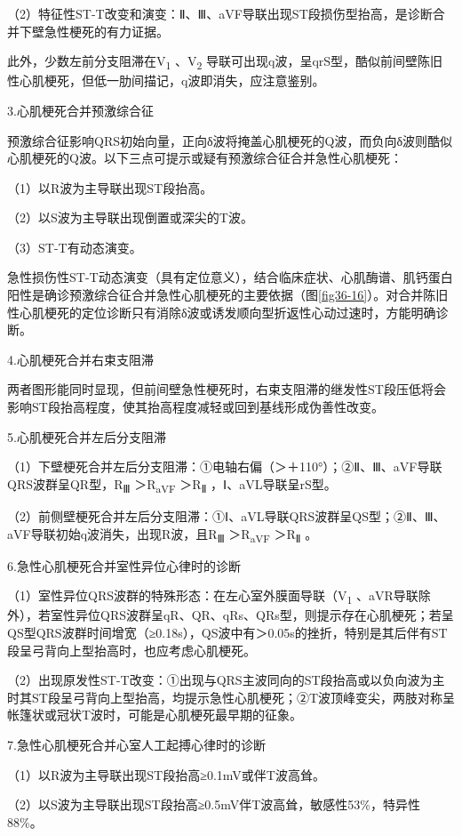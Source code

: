 （2）特征性ST-T改变和演变：Ⅱ、Ⅲ、aVF导联出现ST段损伤型抬高，是诊断合并下壁急性梗死的有力证据。

此外，少数左前分支阻滞在V\textsubscript{1} 、V\textsubscript{2}
导联可出现q波，呈qrS型，酷似前间壁陈旧性心肌梗死，但低一肋间描记，q波即消失，应注意鉴别。

3.心肌梗死合并预激综合征

预激综合征影响QRS初始向量，正向δ波将掩盖心肌梗死的Q波，而负向δ波则酷似心肌梗死的Q波。以下三点可提示或疑有预激综合征合并急性心肌梗死：

（1）以R波为主导联出现ST段抬高。

（2）以S波为主导联出现倒置或深尖的T波。

（3）ST-T有动态演变。

急性损伤性ST-T动态演变（具有定位意义），结合临床症状、心肌酶谱、肌钙蛋白阳性是确诊预激综合征合并急性心肌梗死的主要依据（图\ref{fig36-16}）。对合并陈旧性心肌梗死的定位诊断只有消除δ波或诱发顺向型折返性心动过速时，方能明确诊断。

4.心肌梗死合并右束支阻滞

两者图形能同时显现，但前间壁急性梗死时，右束支阻滞的继发性ST段压低将会影响ST段抬高程度，使其抬高程度减轻或回到基线形成伪善性改变。

5.心肌梗死合并左后分支阻滞

（1）下壁梗死合并左后分支阻滞：①电轴右偏（＞＋110°）；②Ⅱ、Ⅲ、aVF导联QRS波群呈QR型，R\textsubscript{Ⅲ}
＞R\textsubscript{aVF} ＞R\textsubscript{Ⅱ} ，Ⅰ、aVL导联呈rS型。

（2）前侧壁梗死合并左后分支阻滞：①Ⅰ、aVL导联QRS波群呈QS型；②Ⅱ、Ⅲ、aVF导联初始q波消失，出现R波，且R\textsubscript{Ⅲ}
＞R\textsubscript{aVF} ＞R\textsubscript{Ⅱ} 。

6.急性心肌梗死合并室性异位心律时的诊断

（1）室性异位QRS波群的特殊形态：在左心室外膜面导联（V\textsubscript{1}
、aVR导联除外），若室性异位QRS波群呈qR、QR、qRs、QRs型，则提示存在心肌梗死；若呈QS型QRS波群时间增宽（≥0.18s），QS波中有＞0.05s的挫折，特别是其后伴有ST段呈弓背向上型抬高时，也应考虑心肌梗死。

（2）出现原发性ST-T改变：①出现与QRS主波同向的ST段抬高或以负向波为主时其ST段呈弓背向上型抬高，均提示急性心肌梗死；②T波顶峰变尖，两肢对称呈帐篷状或冠状T波时，可能是心肌梗死最早期的征象。

7.急性心肌梗死合并心室人工起搏心律时的诊断

（1）以R波为主导联出现ST段抬高≥0.1mV或伴T波高耸。

（2）以S波为主导联出现ST段抬高≥0.5mV伴T波高耸，敏感性53\%，特异性88\%。

